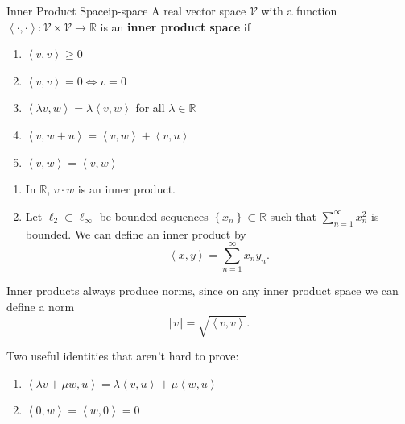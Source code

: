 \documentclass[10pt]{report}
\begin{document}
\begin{defn}{Inner Product Space}{ip-space}
	A real vector space $\mathcal{V}$ with a function $\left\langle \cdot,\cdot \right\rangle:\mathcal{V}\times\mathcal{V}\to\mathbb{R}$ is an \textbf{inner product space} if
	\begin{enumerate}
		\item $\left\langle v,v \right\rangle\geq 0$ 
		\item $\left\langle v,v \right\rangle=0 \iff v=0$ 
		\item $\left\langle \lambda v,w \right\rangle= \lambda \left\langle v,w \right\rangle$ for all $\lambda \in \mathbb{R}$ 
		\item $\left\langle v,w+u \right\rangle=\left\langle v,w \right\rangle+\left\langle v,u \right\rangle$ 
		\item $\left\langle v,w \right\rangle=\left\langle v,w \right\rangle$
	\end{enumerate}
\end{defn}

\begin{ex}{}{}
	\begin{enumerate}
		\item In $\mathbb{R}$, $v\cdot w $ is an inner product.
		\item Let $\ell_2 \subset \ell_{\infty}$ be bounded sequences $\left\{ x_n \right\}\subset \mathbb{R}$ such that $\sum_{n=1}^{\infty} x_n^2$ is bounded. We can define an inner product by
			\[
			\left\langle x,y \right\rangle=\sum_{n=1}^{\infty} x_n y_n.
			\] 
	\end{enumerate}
\end{ex}

Inner products always produce norms, since on any inner product space we can define a norm \[\Vert{v}\Vert=\sqrt{\left\langle v,v \right\rangle}.\]

Two useful identities that aren't hard to prove:
\begin{enumerate}
	\item $\left\langle \lambda v + \mu w, u \right\rangle=\lambda \left\langle v,u \right\rangle+\mu\left\langle w,u \right\rangle$ 
	\item $\left\langle 0,w \right\rangle=\left\langle w,0 \right\rangle=0$
\end{enumerate}
\end{document}
